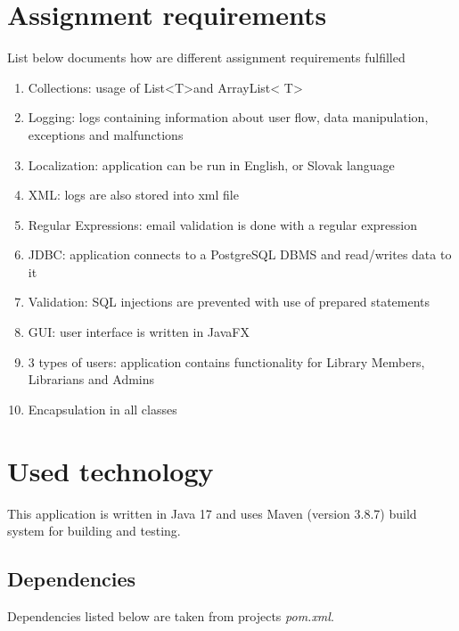 \documentclass[11pt,twoside,a4paper]{article}
\begin{document}
\pagebreak
\section{Assignment requirements}

List below documents how are different assignment requirements fulfilled
\begin{enumerate}
    \item Collections: usage of List\textless T\textgreater and ArrayList\textless
          T\textgreater
    \item Logging: logs containing information about user flow, data manipulation,
          exceptions and malfunctions
    \item Localization: application can be run in English, or Slovak language
    \item XML: logs are also stored into xml file
    \item Regular Expressions: email validation is done with a regular expression
    \item JDBC: application connects to a PostgreSQL DBMS and read/writes data to it
    \item Validation: SQL injections are prevented with use of prepared statements
    \item GUI: user interface is written in JavaFX
    \item 3 types of users: application contains functionality for Library Members, Librarians and Admins
    \item Encapsulation in all classes
\end{enumerate}

\section{Used technology}

This application is written in Java 17 and uses Maven (version 3.8.7) build
system for building and testing.

\subsection*{Dependencies}

Dependencies listed below are taken from projects \emph{pom.xml}.
\end{document}
